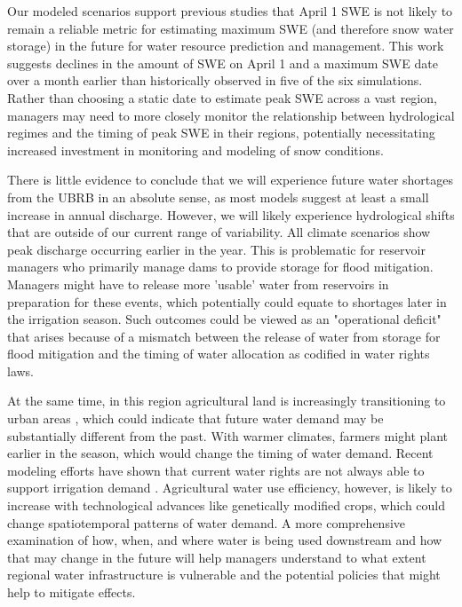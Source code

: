 \documentclass[water,article,submit,moreauthors,pdftex,10pt,a4paper]{mdpi}
\theoremstyle{mdpi}
\newcounter{ex}
\newcounter{re}
\theoremstyle{mdpidefinition}
\begin{document}
Our modeled scenarios support previous studies \citep{Pederson:2011ep,Klos:2014jra} that April 1 SWE is not likely to remain a reliable metric for estimating maximum SWE (and therefore snow water storage) in the future for water resource prediction and management. This work suggests declines in the amount of SWE on April 1 and a maximum SWE date over a month earlier than historically observed in five of the six simulations. Rather than choosing a static date to estimate peak SWE across a vast region, managers may need to more closely monitor the relationship between hydrological regimes and the timing of peak SWE in their regions, potentially necessitating increased investment in monitoring and modeling of snow conditions.

There is little evidence to conclude that we will experience future water shortages from the UBRB in an absolute sense, as most models suggest at least a small increase in annual discharge. However, we will likely experience hydrological shifts that are outside of our current range of variability. All climate scenarios show peak discharge occurring earlier in the year. This is problematic for reservoir managers who primarily manage dams to provide storage for flood mitigation. Managers might have to release more 'usable' water from reservoirs in preparation for these events, which potentially could equate to shortages later in the irrigation season. Such outcomes could be viewed as an "operational deficit" that arises because of a mismatch between the release of water from storage for flood mitigation and the timing of water allocation as codified in water rights laws.

At the same time, in this region agricultural land is increasingly transitioning to urban areas \citep{Dahal:2017ux}, which could indicate that future water demand may be substantially different from the past. With warmer climates, farmers might plant earlier in the season, which would change the timing of water demand. Recent modeling efforts have shown that current water rights are not always able to support irrigation demand \citep{Deb:2015vp,Han:2017tx}. Agricultural water use efficiency, however, is likely to increase with technological advances like genetically modified crops, which could change spatiotemporal patterns of water demand. A more comprehensive examination of how, when, and where water is being used downstream and how that may change in the future will help managers understand to what extent regional water infrastructure is vulnerable and the potential policies that might help to mitigate effects. 
\end{document}
